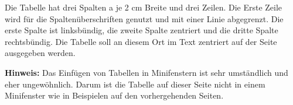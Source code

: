 
Die Tabelle hat drei Spalten a je 2 cm Breite und drei Zeilen. Die Erste Zeile wird für die Spaltenüberschriften genutzt und mit einer Linie abgegrenzt. Die erste Spalte ist linksbündig, die zweite Spalte zentriert und die dritte Spalte rechtsbündig. Die Tabelle soll an diesem Ort im Text zentriert auf der Seite ausgegeben werden.

\textbf{Hinweis:} Das Einfügen von Tabellen in Minifenstern ist sehr umständlich und eher ungewöhnlich. Darum ist die Tabelle auf dieser Seite nicht in einem Minifenster wie in Beispielen auf den vorhergehenden Seiten.
